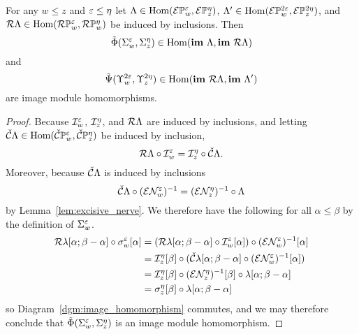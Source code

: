 \begin{lemma}\label{lem:rips_homomorphisms}
  For any $w\leq z$ and $\varepsilon\leq\eta$ let $\Lambda\in\mathrm{Hom}(\mathcal{E} \mathbb{P}_{w}^{\varepsilon}, \mathcal{E} \mathbb{P}_{z}^{\eta})$, $\Lambda'\in\mathrm{Hom}(\mathcal{E} \mathbb{P}_{w}^{2\varepsilon},\mathcal{E} \mathbb{P}_{z}^{2\eta})$, and $\mathcal{R}\Lambda\in\mathrm{Hom}(\mathcal{R}\mathbb{P}_{w}^{\varepsilon},\mathcal{R}\mathbb{P}_{w}^{\eta})$ be induced by inclusions.
  Then
  \[ \tilde{\Phi}(\Sigma_w^\varepsilon,\Sigma_z^\eta)\in\mathrm{Hom}(\mathbf{im}~\Lambda,\mathbf{im}~\mathcal{R}\Lambda)\]
  and
  \[ \tilde{\Psi}(\Upsilon_w^{2\varepsilon},\Upsilon_z^{2\eta})\in\mathrm{Hom}(\mathbf{im}~\mathcal{R}\Lambda,\mathbf{im}~\Lambda')\]
  are image module homomorphisms.
\end{lemma}
\begin{proof}
  Because $\mathcal{I}_w^\varepsilon$, $\mathcal{I}_z^\eta$, and $\mathcal{R}\Lambda$ are induced by inclusions, and letting $\check{\mathcal{C}}\Lambda\in\mathrm{Hom}(\check{\mathcal{C}}\mathbb{P}_{w}^{\varepsilon},\check{\mathcal{C}}\mathbb{P}_{z}^{\eta})$ be induced by inclusion,
  \[ \mathcal{R}\Lambda\circ\mathcal{I}_w^\varepsilon = \mathcal{I}_z^\eta\circ\check{\mathcal{C}}\Lambda.\]
  Moreover, because $\check{\mathcal{C}}\Lambda$ is induced by inclusions
  \[\check{\mathcal{C}}\Lambda\circ(\mathcal{E}\mathcal{N}_w^\varepsilon)^{-1} = (\mathcal{E}\mathcal{N}_z^\eta)^{-1}\circ\Lambda\]
  by Lemma~\ref{lem:excisive_nerve}.
  We therefore have the following for all $\alpha\leq\beta$ by the definition of $\Sigma_w^\varepsilon$.
  \begin{align*}
    \mathcal{R}\lambda[\alpha;\beta-\alpha]\circ\sigma_w^\varepsilon[\alpha] &= (\mathcal{R}\lambda[\alpha;\beta-\alpha]\circ\mathcal{I}_w^\varepsilon[\alpha])\circ (\mathcal{E}\mathcal{N}_w^\varepsilon)^{-1}[\alpha]\\
      &= \mathcal{I}_z^\eta[\beta]\circ(\check{\mathcal{C}}\lambda[\alpha;\beta-\alpha]\circ (\mathcal{E}\mathcal{N}_w^\varepsilon)^{-1}[\alpha])\\
      &= \mathcal{I}_z^\eta[\beta]\circ (\mathcal{E}\mathcal{N}_z^\eta)^{-1}[\beta]\circ\lambda[\alpha;\beta-\alpha]\\
      &= \sigma_z^\eta[\beta]\circ\lambda[\alpha;\beta-\alpha]
  \end{align*}
  so Diagram~\ref{dgm:image_homomorphism} commutes, and we may therefore conclude that $\tilde{\Phi}(\Sigma_w^\varepsilon,\Sigma_z^\eta)$ is an image module homomorphism.


\end{proof}
